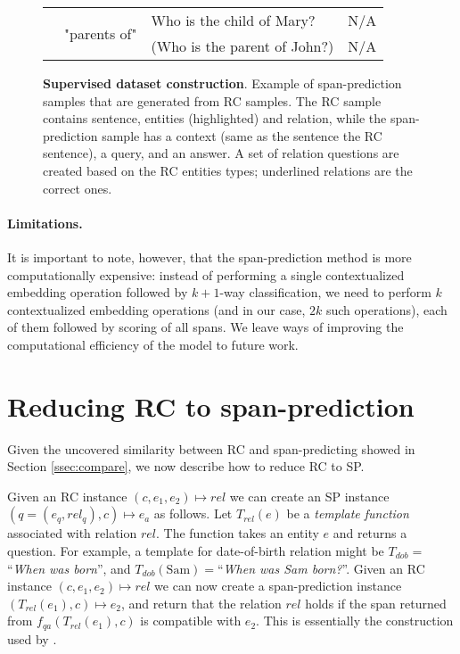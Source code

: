 \documentclass[11pt]{article}
\begin{document}
\begin{figure*}[t!]
\begin{tabular}{llll}
                                         & \multirow{2}{*}{"parents of"}                                           & Who is the child of Mary?                                                      & N/A             \\ \cline{4-4} 
                                         &                                                                         & (Who is the parent of John?)                                                   & N/A             \\ \hline
\end{tabular}
\caption{\textbf{Supervised dataset construction}. Example of span-prediction samples that are generated from RC samples. The RC sample contains sentence, entities (highlighted) and relation, while the span-prediction sample has a context (same as the sentence the RC sentence), a query, and an answer. A set of relation questions are created based on the RC entities types; underlined relations are the correct ones.}
\label{fig:mrcqa-example}
\end{figure*}

\paragraph{Limitations.} It is important to note, however, that the span-prediction method is more computationally expensive: instead of performing a single contextualized embedding operation followed by $k+1$-way classification, we need to perform $k$ contextualized embedding operations (and in our case, $2k$ such operations), each of them followed by scoring of all spans. We leave ways of improving the computational efficiency of the model to future work.








\section{Reducing RC to span-prediction} \label{sec:method}
Given the uncovered similarity between RC and span-predicting showed in Section \ref{ssec:compare}, we now describe how to reduce RC to SP.

Given an RC instance $(c, e_1, e_2) \mapsto rel$ we can create an SP instance $(q=(e_q, rel_q), c) \mapsto e_a$ as follows. Let $T_{rel}(e)$ be a \emph{template function} associated with relation $rel$. The function takes an entity $e$ and returns a question. For example, a template for date-of-birth relation might be $T_{dob}=$``\textit{When was \underline{\hspace{1em}} born}'', and $T_{dob}(\text{Sam})=$``\textit{When was Sam born?}''. Given an RC instance $(c, e_1, e_2) \mapsto rel$ we can now create a span-prediction instance $(T_{rel}(e_1), c) \mapsto e_2$, and return that the relation $rel$ holds if the span returned from $f_{qa}(T_{rel}(e_1), c)$ is compatible with $e_2$. This is essentially the construction used by \citep{Levy2017}. 
\end{document}
